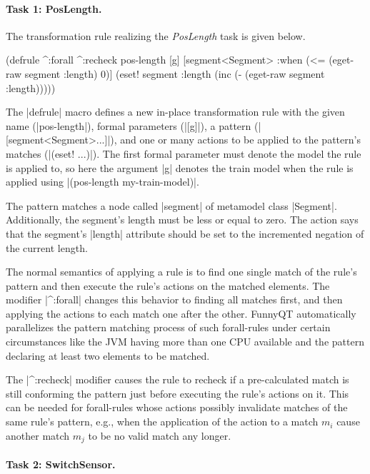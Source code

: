 \documentclass[submission]{eptcs}
\newcommand{\code}{\clojureinline}
\begin{document}
\paragraph{Task 1: PosLength.}

The transformation rule realizing the \emph{PosLength} task is given below.

\begin{clojurecode}
(defrule ^:forall ^:recheck pos-length [g]
  [segment<Segment>
   :when (<= (eget-raw segment :length) 0)]
  (eset! segment :length (inc (- (eget-raw segment :length)))))
\end{clojurecode}

The \code|defrule| macro defines a new in-place transformation rule with the
given name (\code|pos-length|), formal parameters (\code|[g]|), a pattern
(\code|[segment<Segment>...]|), and one or many actions to be applied to the
pattern's matches (\code|(eset! ...)|).  The first formal parameter must denote
the model the rule is applied to, so here the argument \code|g| denotes the
train model when the rule is applied using \code|(pos-length my-train-model)|.

The pattern matches a node called \code|segment| of metamodel class
\code|Segment|.  Additionally, the segment's length must be less or equal to
zero.  The action says that the segment's \code|length| attribute should be set
to the incremented negation of the current length.

The normal semantics of applying a rule is to find one single match of the
rule's pattern and then execute the rule's actions on the matched elements.
The modifier \code|^:forall| changes this behavior to finding all matches
first, and then applying the actions to each match one after the other.
FunnyQT automatically parallelizes the pattern matching process of such
forall-rules under certain circumstances like the JVM having more than one CPU
available and the pattern declaring at least two elements to be matched.

The \code|^:recheck| modifier causes the rule to recheck if a pre-calculated
match is still conforming the pattern just before executing the rule's actions
on it.  This can be needed for forall-rules whose actions possibly invalidate
matches of the same rule's pattern, e.g., when the application of the action to
a match \(m_i\) cause another match \(m_j\) to be no valid match any longer.


\paragraph{Task 2: SwitchSensor.}
\end{document}
